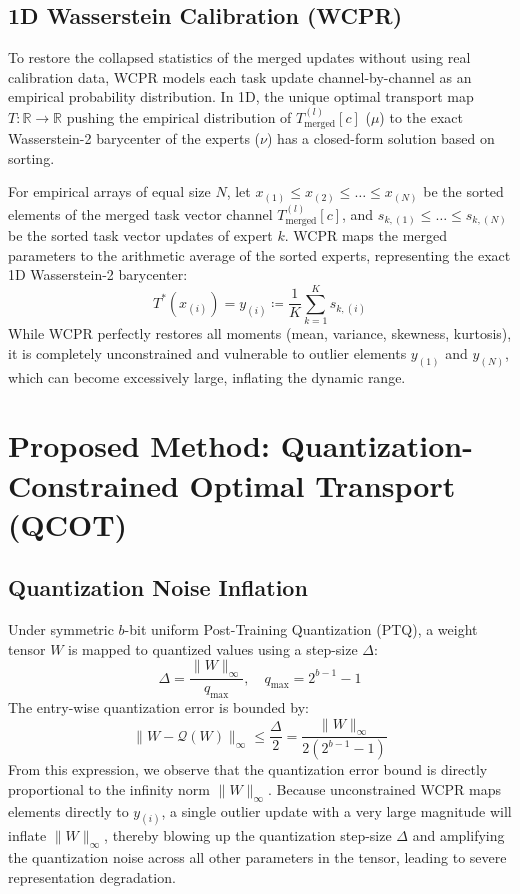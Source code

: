 \documentclass{article}
\theoremstyle{plain}
\theoremstyle{definition}
\theoremstyle{remark}
\begin{document}
\subsection{1D Wasserstein Calibration (WCPR)}
To restore the collapsed statistics of the merged updates without using real calibration data, WCPR models each task update channel-by-channel as an empirical probability distribution. In 1D, the unique optimal transport map $T : \mathbb{R} \to \mathbb{R}$ pushing the empirical distribution of $T_{\text{merged}}^{(l)}[c]$ ($\mu$) to the exact Wasserstein-2 barycenter of the experts ($\nu$) has a closed-form solution based on sorting.

For empirical arrays of equal size $N$, let $x_{(1)} \le x_{(2)} \le \dots \le x_{(N)}$ be the sorted elements of the merged task vector channel $T_{\text{merged}}^{(l)}[c]$, and $s_{k, (1)} \le \dots \le s_{k, (N)}$ be the sorted task vector updates of expert $k$. WCPR maps the merged parameters to the arithmetic average of the sorted experts, representing the exact 1D Wasserstein-2 barycenter:
\begin{equation}
    T^*(x_{(i)}) = y_{(i)} \coloneqq \frac{1}{K} \sum_{k=1}^K s_{k, (i)}
\end{equation}
While WCPR perfectly restores all moments (mean, variance, skewness, kurtosis), it is completely unconstrained and vulnerable to outlier elements $y_{(1)}$ and $y_{(N)}$, which can become excessively large, inflating the dynamic range.

\section{Proposed Method: Quantization-Constrained Optimal Transport (QCOT)}
\label{sec:qcot}

\subsection{Quantization Noise Inflation}
Under symmetric $b$-bit uniform Post-Training Quantization (PTQ), a weight tensor $W$ is mapped to quantized values using a step-size $\Delta$:
\begin{equation}
    \Delta = \frac{\|W\|_{\infty}}{q_{\max}}, \quad q_{\max} = 2^{b-1} - 1
\end{equation}
The entry-wise quantization error is bounded by:
\begin{equation}
    \|W - \mathcal{Q}(W)\|_{\infty} \le \frac{\Delta}{2} = \frac{\|W\|_{\infty}}{2(2^{b-1} - 1)}
\end{equation}
From this expression, we observe that the quantization error bound is directly proportional to the infinity norm $\|W\|_{\infty}$. Because unconstrained WCPR maps elements directly to $y_{(i)}$, a single outlier update with a very large magnitude will inflate $\|W\|_{\infty}$, thereby blowing up the quantization step-size $\Delta$ and amplifying the quantization noise across all other parameters in the tensor, leading to severe representation degradation.
\end{document}
